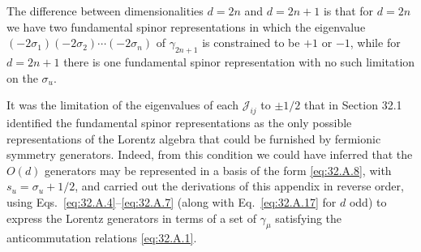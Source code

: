 The difference between dimensionalities \(d=2n\) and \(d=2n+1\) is that
for \(d=2n\) we have two fundamental spinor representations in which the
eigenvalue
\((-2\sigma_1)(-2\sigma_2)\cdots(-2\sigma_n)\) of \(\gamma_{2n+1}\) is
constrained to be \(+1\) or \(-1\), while for \(d=2n+1\) there is one
fundamental spinor representation with no such limitation on the
\(\sigma_u\).

It was the limitation of the eigenvalues of each \(\mathcal J_{ij}\) to
\(\pm1/2\) that in Section 32.1 identified the fundamental spinor
representations as the only possible representations of the Lorentz
algebra that could be furnished by fermionic symmetry generators. Indeed,
from this condition we could have inferred that the \(O(d)\) generators
may be represented in a basis of the form \eqref{eq:32.A.8}, with
\(s_u=\sigma_u+1/2\), and carried out the derivations of this appendix in
reverse order, using Eqs.~\eqref{eq:32.A.4}--\eqref{eq:32.A.7} (along
with Eq.~\eqref{eq:32.A.17} for \(d\) odd) to express the Lorentz
generators in terms of a set of \(\gamma_\mu\) satisfying the
anticommutation relations \eqref{eq:32.A.1}.
